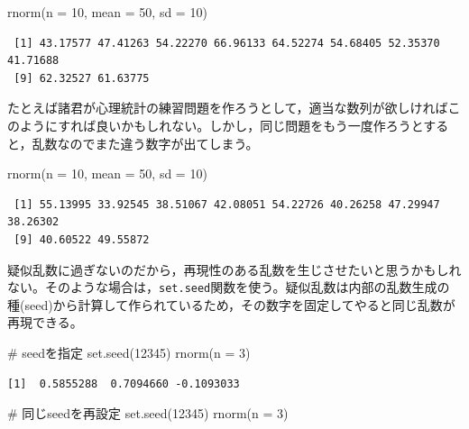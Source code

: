 \documentclass[
  a4paper,
]{ltjsbook}
\newenvironment{Shaded}{\begin{snugshade}}{\end{snugshade}}
\newcommand{\AttributeTok}[1]{\textcolor[rgb]{0.40,0.45,0.13}{#1}}
\newcommand{\CommentTok}[1]{\textcolor[rgb]{0.37,0.37,0.37}{#1}}
\newcommand{\DecValTok}[1]{\textcolor[rgb]{0.68,0.00,0.00}{#1}}
\newcommand{\FunctionTok}[1]{\textcolor[rgb]{0.28,0.35,0.67}{#1}}
\newcommand{\NormalTok}[1]{\textcolor[rgb]{0.00,0.23,0.31}{#1}}
\begin{document}
\begin{Shaded}
\begin{Highlighting}[]
\FunctionTok{rnorm}\NormalTok{(}\AttributeTok{n =} \DecValTok{10}\NormalTok{, }\AttributeTok{mean =} \DecValTok{50}\NormalTok{, }\AttributeTok{sd =} \DecValTok{10}\NormalTok{)}
\end{Highlighting}
\end{Shaded}

\begin{verbatim}
 [1] 43.17577 47.41263 54.22270 66.96133 64.52274 54.68405 52.35370 41.71688
 [9] 62.32527 61.63775
\end{verbatim}

たとえば諸君が心理統計の練習問題を作ろうとして，適当な数列が欲しければこのようにすれば良いかもしれない。しかし，同じ問題をもう一度作ろうとすると，乱数なのでまた違う数字が出てしまう。

\begin{Shaded}
\begin{Highlighting}[]
\FunctionTok{rnorm}\NormalTok{(}\AttributeTok{n =} \DecValTok{10}\NormalTok{, }\AttributeTok{mean =} \DecValTok{50}\NormalTok{, }\AttributeTok{sd =} \DecValTok{10}\NormalTok{)}
\end{Highlighting}
\end{Shaded}

\begin{verbatim}
 [1] 55.13995 33.92545 38.51067 42.08051 54.22726 40.26258 47.29947 38.26302
 [9] 40.60522 49.55872
\end{verbatim}

疑似乱数に過ぎないのだから，再現性のある乱数を生じさせたいと思うかもしれない。そのような場合は，\texttt{set.seed}関数を使う。疑似乱数は内部の乱数生成の種(seed)から計算して作られているため，その数字を固定してやると同じ乱数が再現できる。

\begin{Shaded}
\begin{Highlighting}[]
\CommentTok{\# seedを指定}
\FunctionTok{set.seed}\NormalTok{(}\DecValTok{12345}\NormalTok{)}
\FunctionTok{rnorm}\NormalTok{(}\AttributeTok{n =} \DecValTok{3}\NormalTok{)}
\end{Highlighting}
\end{Shaded}

\begin{verbatim}
[1]  0.5855288  0.7094660 -0.1093033
\end{verbatim}

\begin{Shaded}
\begin{Highlighting}[]
\CommentTok{\# 同じseedを再設定}
\FunctionTok{set.seed}\NormalTok{(}\DecValTok{12345}\NormalTok{)}
\FunctionTok{rnorm}\NormalTok{(}\AttributeTok{n =} \DecValTok{3}\NormalTok{)}
\end{Highlighting}
\end{Shaded}
\end{document}
